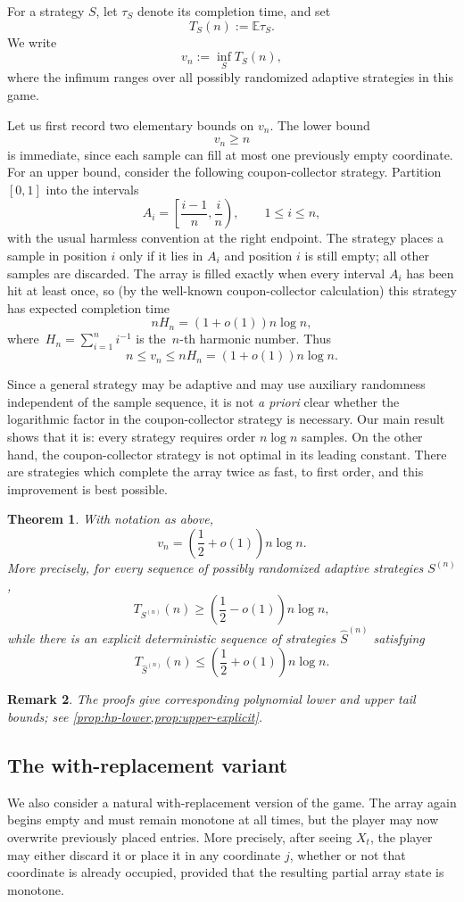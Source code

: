\documentclass[11pt,reqno,letterpaper]{amsart}
\newtheorem{theorem}{Theorem}[section]
\newtheorem{remark}[theorem]{Remark}
\theoremstyle{definition}
\numberwithin{equation}{section}
\newcommand{\E}{\mathbb{E}}
\begin{document}
For a strategy \(S\), let \(\tau_S\) denote its completion time, and set
\[
T_S(n):=\E \tau_S.
\]
We write
\[
v_n:=\inf_S T_S(n),
\]
where the infimum ranges over all possibly randomized adaptive strategies in this
game.

Let us first record two elementary bounds on \(v_n\).  The lower bound
\[
v_n\ge n
\]
is immediate, since each sample can fill at most one previously empty coordinate.
For an upper bound, consider the following coupon-collector strategy.  Partition
\([0,1]\) into the intervals
\[
A_i=\left[\frac{i-1}{n},\frac{i}{n}\right),\qquad 1\le i\le n,
\]
with the usual harmless convention at the right endpoint.  The strategy places a
sample in position \(i\) only if it lies in \(A_i\) and position \(i\) is still empty;
all other samples are discarded.  The array is filled exactly when every interval
\(A_i\) has been hit at least once, so (by the well-known coupon-collector calculation) this strategy has expected completion time
\[
nH_n=(1+o(1))n\log n,
\]
where~$H_n = \sum_{i=1}^ni^{-1}$ is the~$n$-th harmonic number.
Thus
\[
n\le v_n\le nH_n=(1+o(1))n\log n.
\]

Since a general strategy may be adaptive and may use auxiliary randomness independent
of the sample sequence, it is not \emph{a priori} clear whether the logarithmic factor
in the coupon-collector strategy is necessary.  Our main result shows that it is:
every strategy requires order \(n\log n\) samples.  On the other hand, the
coupon-collector strategy is not optimal in its leading constant.  There are
strategies which complete the array twice as fast, to first order, and this improvement
is best possible.

\begin{theorem}\label{thm:main}
With notation as above,
\[
v_n=\left(\frac12+o(1)\right)n\log n.
\]
More precisely, for every sequence of possibly randomized adaptive strategies
\(S^{(n)}\),
\[
T_{S^{(n)}}(n)\ge \left(\frac12-o(1)\right)n\log n,
\]
while there is an explicit deterministic sequence of strategies \(\widehat S^{(n)}\)
satisfying
\[
T_{\widehat S^{(n)}}(n)\le \left(\frac12+o(1)\right)n\log n.
\]
\end{theorem}

\begin{remark}
The proofs give corresponding polynomial lower and upper tail bounds; see
\cref{prop:hp-lower,prop:upper-explicit}.
\end{remark}

\subsection{The with-replacement variant} 
We also consider a natural with-replacement version of the game.  The array again
begins empty and must remain monotone at all times, but the player may now overwrite
previously placed entries.  More precisely, after seeing \(X_t\), the player may either
discard it or place it in any coordinate \(j\), whether or not that coordinate is already
occupied, provided that the resulting partial array state is monotone.
\end{document}
